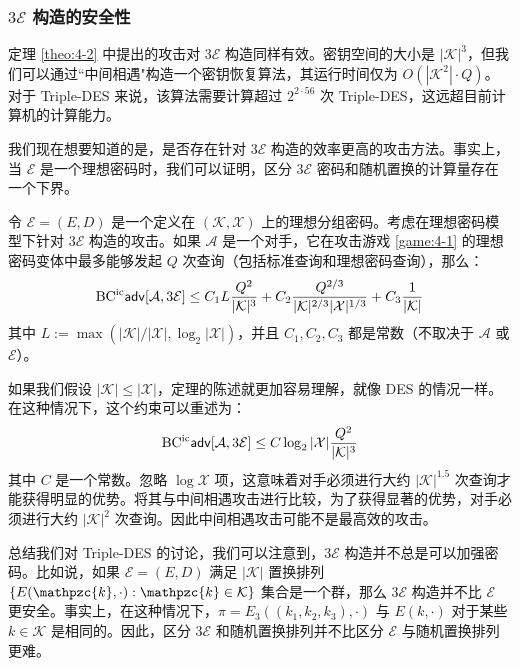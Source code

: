 \subsubsection{$3\mathcal{E}$ 构造的安全性}

定理 \ref{theo:4-2} 中提出的攻击对 $3\mathcal{E}$ 构造同样有效。密钥空间的大小是 $|\mathcal{K}|^3$，但我们可以通过``中间相遇"构造一个密钥恢复算法，其运行时间仅为 $O(|\mathcal{K}^2|\cdot Q)$。对于 Triple-DES 来说，该算法需要计算超过 $2^{2\cdot56}$ 次 Triple-DES，这远超目前计算机的计算能力。

我们现在想要知道的是，是否存在针对 $3\mathcal{E}$ 构造的效率更高的攻击方法。事实上，当 $\mathcal{E}$ 是一个理想密码时，我们可以证明，区分 $3\mathcal{E}$ 密码和随机置换的计算量存在一个下界。

\begin{theorem}\label{theo:4-13}
令 $\mathcal{E}=(E,D)$ 是一个定义在 $(\mathcal{K},\mathcal{X})$ 上的理想分组密码。考虑在理想密码模型下针对 $3\mathcal{E}$ 构造的攻击。如果 $\mathcal{A}$ 是一个对手，它在攻击游戏 \ref{game:4-1} 的理想密码变体中最多能够发起 $Q$ 次查询（包括标准查询和理想密码查询），那么：
\[
{\rm BC^{ic}\mathsf{adv}}[\mathcal{A},3\mathcal{E}]\leq C_1L\frac{Q^2}{|\mathcal{K}|^3}+C_2\frac{Q^{2/3}}{|\mathcal{K}|^{2/3}|\mathcal{X}|^{1/3}}+C_3\frac{1}{|\mathcal{K}|}
\]
其中 $L:=\max({|\mathcal{K}|}/{|\mathcal{X}|},\log_2|\mathcal{X}|)$，并且 $C_1,C_2,C_3$ 都是常数（不取决于 $\mathcal{A}$ 或 $\mathcal{E}$）。
\end{theorem}

如果我们假设 $|\mathcal{K}|\leq|\mathcal{X}|$，定理的陈述就更加容易理解，就像 DES 的情况一样。在这种情况下，这个约束可以重述为：
\[
{\rm BC^{ic}\mathsf{adv}}[\mathcal{A},3\mathcal{E}]\leq C\log_2|\mathcal{X}|\frac{Q^2}{|\mathcal{K}|^3}
\]
其中 $C$ 是一个常数。忽略 $\log\mathcal{X}$ 项，这意味着对手必须进行大约 $|\mathcal{K}|^{1.5}$ 次查询才能获得明显的优势。将其与中间相遇攻击进行比较，为了获得显著的优势，对手必须进行大约 $|\mathcal{K}|^2$ 次查询。因此中间相遇攻击可能不是最高效的攻击。

总结我们对 Triple-DES 的讨论，我们可以注意到，$3\mathcal{E}$ 构造并不总是可以加强密码。比如说，如果 $\mathcal{E}=(E,D)$ 满足 $|\mathcal{K}|$ 置换排列 $\{E(\mathpzc{k},\cdot):\mathpzc{k}\in\mathcal{K}\}$ 集合是一个群，那么 $3\mathcal{E}$ 构造并不比 $\mathcal{E}$ 更安全。事实上，在这种情况下，$\pi=E_3((k_1,k_2,k_3),\cdot)$ 与 $E(k,\cdot)$ 对于某些 $k\in\mathcal{K}$ 是相同的。因此，区分 $3\mathcal{E}$ 和随机置换排列并不比区分 $\mathcal{E}$ 与随机置换排列更难。

